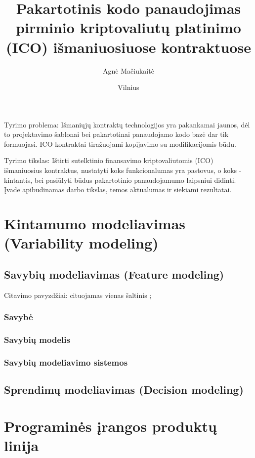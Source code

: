 \documentclass{VUMIFInfKursinis}
\title{Pakartotinis kodo panaudojimas pirminio kriptovaliutų platinimo (ICO) išmaniuosiuose kontraktuose}
\author{Agnė Mačiukaitė}
\date{Vilnius \\ \the\year}
\begin{document}
\maketitle

\tableofcontents

%

Tyrimo problema: Išmaniųjų kontraktų technologijos yra pakankamai jaunos, dėl to projektavimo šablonai bei pakartotinai panaudojamo kodo bazė dar tik formuojasi. ICO kontraktai tiražuojami kopijavimo su modifikacijomis būdu.

Tyrimo tikslas: Ištirti sutelktinio finansavimo kriptovaliutomis (ICO) išmaniuosius kontraktus, nustatyti koks funkcionalumas yra pastovus, o koks - kintantis, bei pasiūlyti būdus pakartotinio panaudojamumo laipsniui didinti.
Įvade apibūdinamas darbo tikslas, temos aktualumas ir siekiami rezultatai.

\section{Kintamumo modeliavimas (Variability modeling)}

\subsection{Savybių modeliavimas (Feature modeling)}
Citavimo pavyzdžiai: cituojamas vienas šaltinis \cite{Berger2010};
\subsubsection{Savybė}
\subsubsection{Savybių modelis}
\subsubsection{Savybių modeliavimo sistemos}
\subsection{Sprendimų modeliavimas (Decision modeling)}
\section{Programinės įrangos produktų linija}
\end{document}
